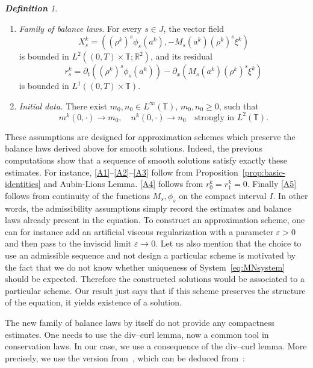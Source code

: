 \documentclass[a4paper,twosided,11pt]{article}
\newcommand{\R}{\mathbb{R}}
\newcommand{\T}{\mathbb{T}}
\newcommand{\eps}{\varepsilon}
\newcommand{\p}{\partial}
\newcommand{\1}{\mathbf{1}}
\theoremstyle{plain}
\theoremstyle{remark}
\newtheorem{definition}[thm]{\bf Definition}
\numberwithin{equation}{section}
\begin{document}
\begin{definition}
\begin{enumerate}[label=(A\arabic*)]
\item \textit{Family of balance laws.}\label{A5}
For every $s\in J$, the vector field
$$
X_s^k=\left((\rho^k)^s\phi_s(a^k),-M_s(a^k)(\rho^k)^s\xi^k\right)
$$
is bounded in $L^2((0,T)\times\T;\R^2)$, and its residual
$$
r_s^k=\p_t\left((\rho^k)^s\phi_s(a^k)\right)-\p_x\left(M_s(a^k)(\rho^k)^s\xi^k\right)
$$
is bounded in $L^1((0,T)\times\T)$.

\item \textit{Initial data.}\label{A6}
There exist $m_0,n_0\in L^\infty(\T)$, $m_0,n_0\ge 0$, such that
$$
 m^k(0,\cdot)\to m_0,
 \quad
 n^k(0,\cdot)\to n_0
 \quad \text{strongly in } L^2(\T).
$$
\end{enumerate}
\end{definition}

These assumptions are designed for approximation schemes which preserve the balance laws derived above for smooth solutions. Indeed, the previous computations show that a sequence of smooth solutions satisfy exactly these estimates. For instance, \ref{A1}--\ref{A2}--\ref{A3} follow from Proposition~\ref{prop:basic-identities} and Aubin-Lions Lemma. \ref{A4} follows from $r_0^k = r_1^k=0$. Finally \ref{A5} follows from continuity of the functions $M_s, \phi_s$ on the compact interval $I$.
In other words, the admissibility assumptions simply record the estimates and balance laws already present in the equation. To construct an approximation scheme, one can for instance add an artificial viscous regularization with a parameter $\eps>0$ and then pass to the inviscid limit $\eps\to 0$. Let us also mention that the choice to use an admissible sequence and not design a particular scheme is motivated by the fact that we do not know whether uniqueness of System~\ref{eq:MNsystem} should be expected. Therefore the constructed solutions would be associated to a particular scheme. Our result just says that if this scheme preserves the structure of the equation, it yields existence of a solution.

The new family of balance laws by itself do not provide any compactness estimates. One needs to use the div--curl lemma, now a common tool in conservation laws. In our case, we use a consequence of the div--curl lemma. More precisely, we use the version from~\cite{Skrzeczkowski2026}, which can be deduced from~\cite{MR2769903}:
\end{document}
